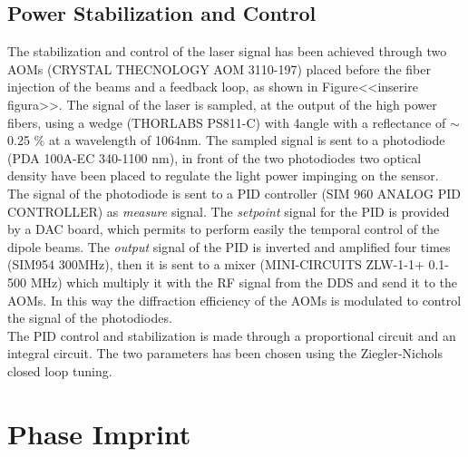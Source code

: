 \documentclass[../thesis.tex]{subfiles}
\begin{document}
\subsection{Power Stabilization and Control}

The stabilization and control of the laser signal has been achieved through two AOMs (CRYSTAL THECNOLOGY AOM 3110-197) placed before the fiber injection of the beams and a feedback loop, as shown in Figure<<inserire figura>>. The signal of the laser is sampled, at the output of the high power fibers, using a wedge (THORLABS PS811-C) with 4\degree angle with a reflectance of $\sim$ 0.25 \% at a wavelength of 1064nm. The sampled signal is sent to a photodiode (PDA 100A-EC 340-1100 nm), in front of the two photodiodes two optical density have been placed to regulate the light power impinging on the sensor. The signal of the photodiode is sent to a PID controller (SIM 960 ANALOG PID CONTROLLER) as \textit{measure} signal. The \textit{setpoint} signal for the PID is provided by a DAC board, which permits to perform easily the temporal control of the dipole beams. The \textit{output} signal of the PID is inverted and amplified four times (SIM954 300MHz), then it is sent to a mixer (MINI-CIRCUITS ZLW-1-1+ 0.1-500 MHz) which multiply it with the RF signal from the DDS and send it to the AOMs. In this way the diffraction efficiency of the AOMs is modulated to control the signal of the photodiodes.\\
The PID control and stabilization is made through a proportional circuit and an integral circuit. The two parameters has been chosen using the Ziegler-Nichols closed loop tuning.


\section{Phase Imprint}
\end{document}

